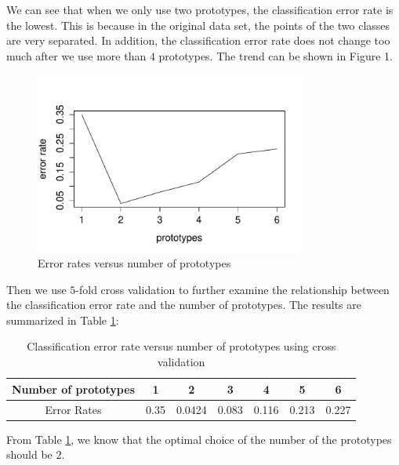 \documentclass[12pt]{article}
\begin{document}
We can see that when we only use two prototypes, the classification error rate is the lowest. This is because in the original data set, the points of the two classes are very separated. In addition, the classification error rate does not change too much after we use more than $4$ prototypes. The trend can be shown in Figure 1.
\begin{figure}
	\centering
	\includegraphics[width=0.8\textwidth]{1.pdf}
	\caption{Error rates versus number of prototypes}
\end{figure}

Then we use $5$-fold cross validation to further examine the relationship between the classification error rate and the number of prototypes. The results are summarized in Table \ref{tab2}:
\begin{table}[htbp]
	\begin{center}
		\caption{\label{tab2} Classification error rate versus number of prototypes using cross validation}
		\begin{tabular}{c|cccccc}
			\hline
			Number of prototypes&1 &2 &3 &4&5&6 \\
			\hline
			Error Rates &0.35 &0.0424 &0.083&0.116&0.213&0.227  \\
			\hline
		\end{tabular}
	\end{center}
\end{table}
From Table \ref{tab2}, we know that the optimal choice of the number of the prototypes should be $2$.
\end{document}
